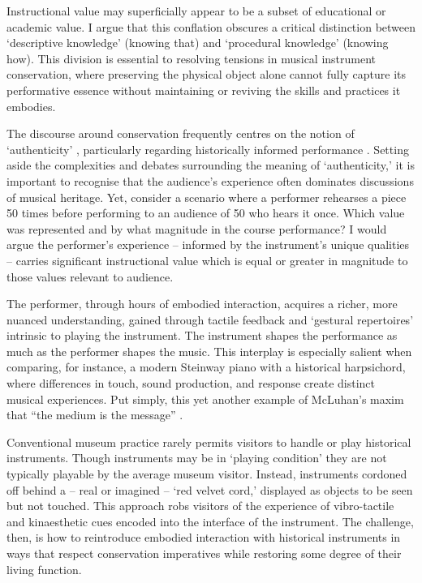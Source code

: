 Instructional value may superficially appear to be a subset of educational or academic value. I argue that this conflation obscures a critical distinction between `descriptive knowledge' (knowing that) and `procedural knowledge' (knowing how). This division is essential to resolving tensions in musical instrument conservation, where preserving the physical object alone cannot fully capture its performative essence without maintaining or reviving the skills and practices it embodies.

The discourse around conservation frequently centres on the notion of `authenticity' \cite{pine_museums_2007, laurenson_authenticity_2006}, particularly regarding historically informed performance \cite{davies_authenticity_2001}. Setting aside the complexities and debates surrounding the meaning of `authenticity,' it is important to recognise that the audience's experience often dominates discussions of musical heritage. Yet, consider a scenario where a performer rehearses a piece 50 times before performing to an audience of 50 who hears it once. Which value was represented and by what magnitude in the course performance? I would argue the performer’s experience -- informed by the instrument’s unique qualities -- carries significant instructional value which is equal or greater in magnitude to those values relevant to audience. 

The performer, through hours of embodied interaction, acquires a richer, more nuanced understanding, gained through tactile feedback and `gestural repertoires' \cite[][]{levinson_music_1990} intrinsic to playing the instrument. The instrument shapes the performance as much as the performer shapes the music. This interplay is especially salient when comparing, for instance, a modern Steinway piano with a historical harpsichord, where differences in touch, sound production, and response create distinct musical experiences. Put simply, this yet another example of McLuhan’s maxim that ``the medium is the message'' \cite[][]{mcluhan_understanding_1964}.

Conventional museum practice rarely permits visitors to handle or play historical instruments. Though instruments may be in `playing condition' they are not typically playable by the average museum visitor. Instead, instruments cordoned off behind a -- real or imagined -- `red velvet cord,' \cite{mcalpine_sampling_2014} displayed as objects to be seen but not touched. This approach robs visitors of the experience of vibro-tactile and kinaesthetic cues encoded into the interface of the instrument. The challenge, then, is how to reintroduce embodied interaction with historical instruments in ways that respect conservation imperatives while restoring some degree of their living function.

